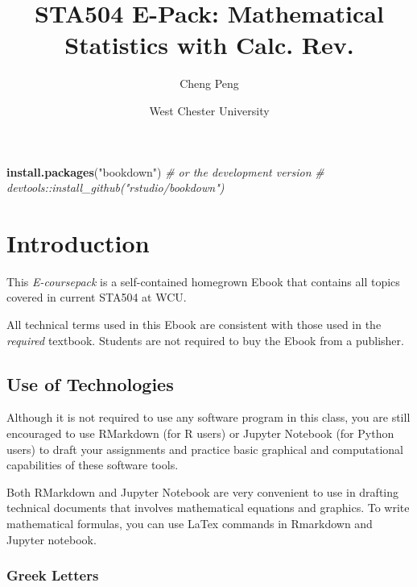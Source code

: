 \documentclass[
]{book}
\title{STA504 E-Pack: Mathematical Statistics with Calc. Rev.}
\author{Cheng Peng}
\date{West Chester University}
\newenvironment{Shaded}{\begin{snugshade}}{\end{snugshade}}
\newcommand{\CommentTok}[1]{\textcolor[rgb]{0.56,0.35,0.01}{\textit{#1}}}
\newcommand{\FunctionTok}[1]{\textcolor[rgb]{0.13,0.29,0.53}{\textbf{#1}}}
\newcommand{\NormalTok}[1]{#1}
\newcommand{\StringTok}[1]{\textcolor[rgb]{0.31,0.60,0.02}{#1}}
\begin{document}
\maketitle

{
\setcounter{tocdepth}{1}
\tableofcontents
}
\begin{Shaded}
\begin{Highlighting}[]
\FunctionTok{install.packages}\NormalTok{(}\StringTok{"bookdown"}\NormalTok{)}
\CommentTok{\# or the development version}
\CommentTok{\# devtools::install\_github("rstudio/bookdown")}
\end{Highlighting}
\end{Shaded}

\hypertarget{introduction}{%
\chapter{Introduction}\label{introduction}}

This \emph{E-coursepack} is a self-contained homegrown Ebook that contains all topics covered in current STA504 at WCU.

All technical terms used in this Ebook are consistent with those used in the \emph{required} textbook. Students are not required to buy the Ebook from a publisher.

\hypertarget{use-of-technologies}{%
\section{Use of Technologies}\label{use-of-technologies}}

Although it is not required to use any software program in this class, you are still encouraged to use RMarkdown (for R users) or Jupyter Notebook (for Python users) to draft your assignments and practice basic graphical and computational capabilities of these software tools.

Both RMarkdown and Jupyter Notebook are very convenient to use in drafting technical documents that involves mathematical equations and graphics. To write mathematical formulas, you can use LaTex commands in Rmarkdown and Jupyter notebook.

\hypertarget{greek-letters}{%
\subsection{Greek Letters}\label{greek-letters}}
\end{document}
